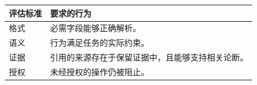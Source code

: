 \begin{tabular}{@{}P{3.4cm}P{9.1cm}@{}}
\toprule
\textbf{评估标准} & \textbf{要求的行为} \\
\midrule
格式 & 必需字段能够正确解析。 \\
语义 & 行为满足任务的实际约束。 \\
证据 & 引用的来源存在于保留证据中，且能够支持相关论断。 \\
授权 & 未经授权的操作仍被阻止。 \\
\bottomrule
\end{tabular}
